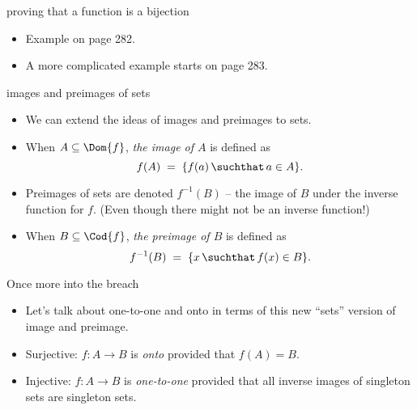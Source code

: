 \documentclass[handout,landscape]{beamer}
\begin{document}
\begin{frame}{proving that a function is a bijection}
\begin{itemize}
\item Example on page 282.
\item A more complicated example starts on page 283.
\end{itemize}
\end{frame}


\begin{frame}{images and preimages of sets}
\begin{itemize}
\item We can extend the ideas of images and preimages to sets. \pause
\item When $A \subseteq \Dom{f}$, {\em the image of $A$} is defined as 
\[ f(A) \; = \; \{ f(a) \, \suchthat \, a \in A \}. \]
\pause
\item Preimages of sets are denoted $f^{-1}(B)$ -- the image of $B$ under the inverse function for $f$. \pause \newline
(Even though there might not be an inverse function!) \pause
\item When $B \subseteq \Cod{f}$, {\em the preimage of $B$} is defined as 
\[ f^{-1}(B) \; = \; \{ x \, \suchthat \, f(x) \in B \}. \]
\pause
\end{itemize}
\end{frame}

\begin{frame}{Once more into the breach}
\begin{itemize}
\item Let's talk about one-to-one and onto in terms of this new ``sets'' version of image and preimage. \pause
\item Surjective: \pause \newline
$f:A \longrightarrow B$ is {\em onto} provided that $f(A) = B$. \pause
\item Injective: \pause \newline
$f:A \longrightarrow B$ is {\em one-to-one} provided that all inverse images of singleton sets are singleton sets.
\end{itemize}
\end{frame}
\end{document}
